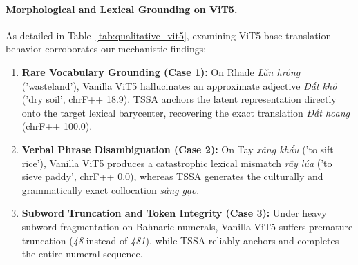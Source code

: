 \documentclass[11pt]{article}
\begin{document}
\paragraph{Morphological and Lexical Grounding on ViT5.}
As detailed in Table~\ref{tab:qualitative_vit5}, examining ViT5-base translation behavior corroborates our mechanistic findings:
\begin{enumerate}[leftmargin=*]
    \item \textbf{Rare Vocabulary Grounding (Case 1):} On Rhade \textit{Lăn hrông} ('wasteland'), Vanilla ViT5 hallucinates an approximate adjective \textit{Đất khô} ('dry soil', chrF++ 18.9). TSSA anchors the latent representation directly onto the target lexical barycenter, recovering the exact translation \textit{Đất hoang} (chrF++ 100.0).
    \item \textbf{Verbal Phrase Disambiguation (Case 2):} On Tay \textit{xâng khẩu} ('to sift rice'), Vanilla ViT5 produces a catastrophic lexical mismatch \textit{rây lúa} ('to sieve paddy', chrF++ 0.0), whereas TSSA generates the culturally and grammatically exact collocation \textit{sàng gạo}.
    \item \textbf{Subword Truncation and Token Integrity (Case 3):} Under heavy subword fragmentation on Bahnaric numerals, Vanilla ViT5 suffers premature truncation (\textit{48} instead of \textit{481}), while TSSA reliably anchors and completes the entire numeral sequence.
\end{enumerate}
\end{document}
